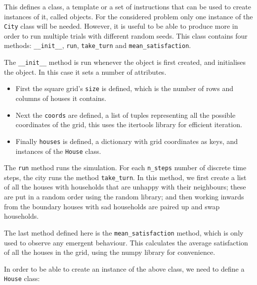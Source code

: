 This defines a class, a template or a set of instructions that can be used to
create instances of it, called objects.
For the considered problem only one instance of the \texttt{City}
class will be needed.
However, it is useful to be able to produce more in order to run multiple trials
with different random seeds.
This class contains four methods: \texttt{__init__},
\texttt{run}, \texttt{take_turn} and
\texttt{mean_satisfaction}.

The \texttt{__init__} method is run whenever the object is first
created, and initialises the object.
In this case it sets a number of attributes.

\begin{itemize}
     \item First the square grid's \texttt{size} is defined, which
           is the number of rows and columns of houses it contains.
     \item Next the \texttt{coords} are defined, a list of tuples
           representing all the possible coordinates of the grid, this uses the
           itertools library for efficient iteration.
     \item Finally \texttt{houses} is defined, a dictionary with
           grid coordinates as keys, and instances of the
           \texttt{House} class.
\end{itemize}


The \texttt{run} method runs the simulation. For each
\texttt{n_steps} number of discrete time steps, the city runs the
method \texttt{take_turn}.
In this method, we first create a list of all the houses with households that
are unhappy with their neighbours; these are put in a random order using the
random library; and then working inwards from the boundary
houses with sad households are paired up and swap households.

The last method defined here is the \texttt{mean_satisfaction}
method, which is only used to observe any emergent behaviour.
This calculates the average satisfaction of all the houses in the grid, using
the numpy library for convenience.

In order to be able to create an instance of the above class, we need to define
a \texttt{House} class:

